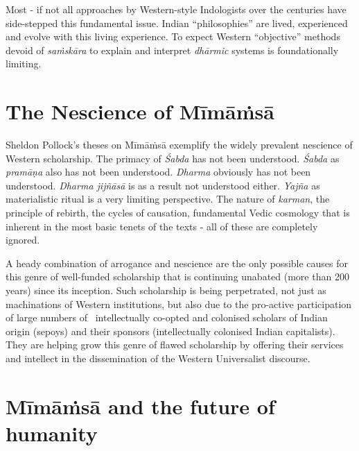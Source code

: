 Most - if not all approaches by Western-style Indologists over the centuries have side-stepped this fundamental issue. Indian “philosophies” are lived, experienced and evolve with this living experience. To expect Western “objective” methods devoid of \textit{saṁskāra} to explain and interpret \textit{dhārmic} systems is foundationally limiting.


\section*{The Nescience of Mīmāṁsā}

Sheldon Pollock’s theses on Mīmāṁsā exemplify the widely prevalent nescience of Western scholarship. The primacy of \textit{Śabda} has not been understood. \textit{Śabda} as \textit{pramāṇa} also has not been understood. \textit{Dharma} obviously has not been understood. \textit{Dharma jijñāsā} is as a result not understood either. \textit{Yajña} as materialistic ritual is a very limiting perspective. The nature of \textit{karman}, the principle of rebirth, the cycles of causation, fundamental Vedic cosmology that is inherent in the most basic tenets of the texts - all of these are completely ignored.

A heady combination of arrogance and nescience are the only possible causes for this genre of well-funded scholarship that is continuing unabated (more than 200 years) since its inception. Such scholarship is being perpetrated, not just as machinations of Western institutions, but also due to the pro-active participation of large numbers of  intellectually co-opted and colonised scholars of Indian origin (sepoys) and their sponsors (intellectually colonised Indian capitalists). They are helping grow this genre of flawed scholarship by offering their services and intellect in the dissemination of the Western Universalist discourse. 

\newpage


\section*{Mīmāṁsā and the future of humanity}

